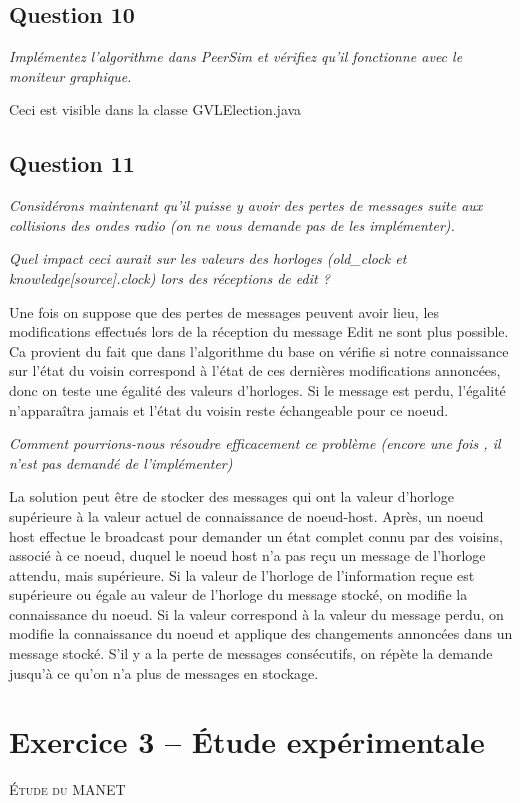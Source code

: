 \documentclass[11pt,a4paper,sans]{report}
\begin{document}
	\section{Question 10}
	\textit{Implémentez l’algorithme dans PeerSim et vérifiez qu’il fonctionne avec le moniteur graphique.}

	Ceci est visible dans la classe GVLElection.java

	\section{Question 11}
	\textit{Considérons maintenant qu’il puisse y avoir des pertes de messages suite aux collisions des ondes radio (on ne vous demande pas de les implémenter).}

	\textit{Quel impact ceci aurait sur les valeurs des horloges (old\_clock et knowledge[source].clock) lors des réceptions de edit ?}
	\par Une fois on suppose que des pertes de messages peuvent avoir lieu, les modifications effectués lors de la réception du message Edit ne sont plus possible. Ca provient du fait que dans l’algorithme du base on vérifie si notre connaissance sur l'état du voisin correspond à l'état de ces dernières modifications annoncées, donc on teste une égalité des valeurs d’horloges. Si le message est perdu, l'égalité n'apparaîtra jamais et l'état du voisin reste échangeable pour ce noeud.


	\textit{Comment pourrions-nous résoudre efficacement ce problème (encore une fois , il n’est pas demandé de l’implémenter)}
	\par La solution peut être de stocker des messages qui ont la valeur d’horloge supérieure à la valeur actuel de connaissance de noeud-host. Après, un noeud host effectue le broadcast pour demander un état complet connu par des voisins, associé à ce noeud, duquel le noeud host n’a pas reçu un message de l’horloge attendu, mais supérieure. Si la valeur de l’horloge de l’information reçue est supérieure ou égale au valeur de l’horloge du message stocké, on modifie la connaissance du noeud. Si la valeur correspond à la valeur du message perdu, on modifie la connaissance du noeud et applique des changements annoncées dans un message stocké. S’il y a la perte de messages consécutifs, on répète la demande jusqu'à ce qu’on n’a plus de messages en stockage.

	\newpage
	\chapter{Exercice 3 – Étude expérimentale}
	\begin{center}
		\textsc{\large Étude du MANET}
	\end{center}
\end{document}
